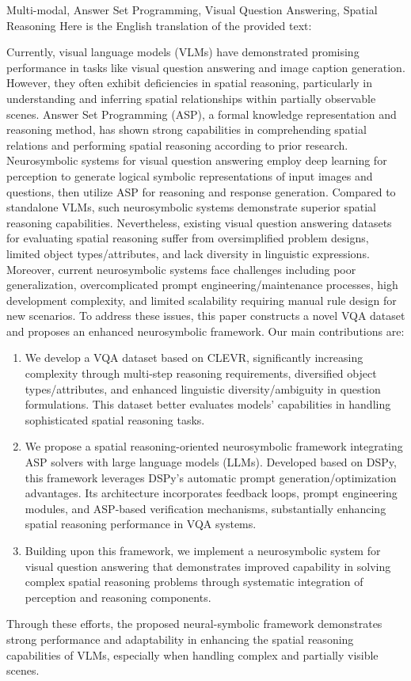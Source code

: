 \begin{englishabstract}{Multi-modal, Answer Set Programming, Visual Question Answering, Spatial Reasoning}
    Here is the English translation of the provided text:

Currently, visual language models (VLMs) have demonstrated promising performance in tasks like visual question answering and image caption generation. However, they often exhibit deficiencies in spatial reasoning, particularly in understanding and inferring spatial relationships within partially observable scenes.
Answer Set Programming (ASP), a formal knowledge representation and reasoning method, has shown strong capabilities in comprehending spatial relations and performing spatial reasoning according to prior research. Neurosymbolic systems for visual question answering employ deep learning for perception to generate logical symbolic representations of input images and questions, then utilize ASP for reasoning and response generation. Compared to standalone VLMs, such neurosymbolic systems demonstrate superior spatial reasoning capabilities. Nevertheless, existing visual question answering datasets for evaluating spatial reasoning suffer from oversimplified problem designs, limited object types/attributes, and lack diversity in linguistic expressions.
Moreover, current neurosymbolic systems face challenges including poor generalization, overcomplicated prompt engineering/maintenance processes, high development complexity, and limited scalability requiring manual rule design for new scenarios. To address these issues, this paper constructs a novel VQA dataset and proposes an enhanced neurosymbolic framework. Our main contributions are:
\begin{enumerate}[itemsep=0pt]
    \item We develop a VQA dataset based on CLEVR, significantly increasing complexity through multi-step reasoning requirements, diversified object types/attributes, and enhanced linguistic diversity/ambiguity in question formulations. This dataset better evaluates models' capabilities in handling sophisticated spatial reasoning tasks.
    \item We propose a spatial reasoning-oriented neurosymbolic framework integrating ASP solvers with large language models (LLMs). Developed based on DSPy, this framework leverages DSPy's automatic prompt generation/optimization advantages. Its architecture incorporates feedback loops, prompt engineering modules, and ASP-based verification mechanisms, substantially enhancing spatial reasoning performance in VQA systems.
    \item Building upon this framework, we implement a neurosymbolic system for visual question answering that demonstrates improved capability in solving complex spatial reasoning problems through systematic integration of perception and reasoning components.
\end{enumerate}

Through these efforts, the proposed neural-symbolic framework demonstrates strong performance and adaptability in enhancing the spatial reasoning capabilities of VLMs, especially when handling complex and partially visible scenes.
\end{englishabstract}

\tableofcontents
\listofothers
